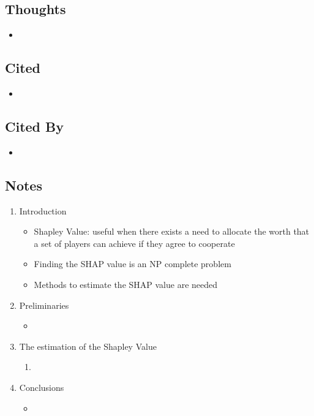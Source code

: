 \documentclass{article}
\begin{document}
\subsection*{Thoughts}
\begin{itemize}
	\item
\end{itemize}

\subsection*{Cited}
\begin{itemize}
	\item
\end{itemize}

\subsection*{Cited By}
\begin{itemize}
	\item
\end{itemize}

\subsection*{Notes}

\begin{enumerate}
	\item Introduction
	\begin{itemize}
		\item Shapley Value: useful when there exists a need to allocate the worth that a set of players can achieve if they agree to cooperate
		\item Finding the SHAP value is an NP complete problem
		\item Methods to estimate the SHAP value are needed
	\end{itemize}
	\item Preliminaries
	\begin{itemize}
		\item 
	\end{itemize}
	\item The estimation of the Shapley Value
	\begin{enumerate}
		\item 
	\end{enumerate}
	\item Conclusions
	\begin{itemize}
		\item 
	\end{itemize}
\end{enumerate}
\end{document}
